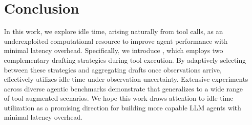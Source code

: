 \section{Conclusion}
\label{sec:conclusion}

In this work, we explore idle time, arising naturally from tool calls, as an underexploited computational resource to improve agent performance with minimal latency overhead.
Specifically, we introduce \methodname{}, which employs two complementary drafting strategies during tool execution. By adaptively selecting between these strategies and aggregating drafts once observations arrive, \methodname{} effectively utilizes idle time under observation uncertainty.
Extensive experiments across diverse agentic benchmarks demonstrate that \methodname{} generalizes to a wide range of tool-augmented scenarios.
We hope this work draws attention to idle-time utilization as a promising direction for building more capable LLM agents with minimal latency overhead.


